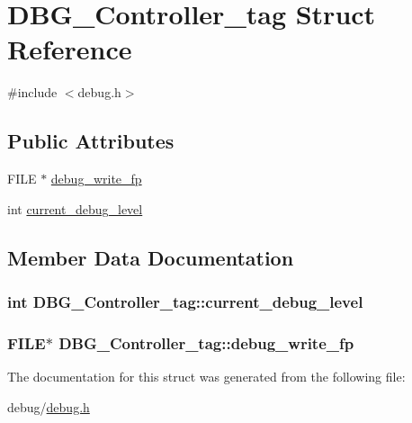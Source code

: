 \hypertarget{struct_d_b_g___controller__tag}{}\section{D\+B\+G\+\_\+\+Controller\+\_\+tag Struct Reference}
\label{struct_d_b_g___controller__tag}


{\ttfamily \#include $<$debug.\+h$>$}

\subsection*{Public Attributes}
\begin{DoxyCompactItemize}
\item 
F\+I\+L\+E $\ast$ \hyperlink{struct_d_b_g___controller__tag_ad3e3029ae7f803b2388ed429b7eaedd8}{debug\+\_\+write\+\_\+fp}
\item 
int \hyperlink{struct_d_b_g___controller__tag_a8ed999c3892963fdb68991a225feb7e7}{current\+\_\+debug\+\_\+level}
\end{DoxyCompactItemize}


\subsection{Member Data Documentation}
\hypertarget{struct_d_b_g___controller__tag_a8ed999c3892963fdb68991a225feb7e7}{}
\subsubsection[{current\+\_\+debug\+\_\+level}]{\setlength{\rightskip}{0pt plus 5cm}int D\+B\+G\+\_\+\+Controller\+\_\+tag\+::current\+\_\+debug\+\_\+level}\label{struct_d_b_g___controller__tag_a8ed999c3892963fdb68991a225feb7e7}
\hypertarget{struct_d_b_g___controller__tag_ad3e3029ae7f803b2388ed429b7eaedd8}{}
\subsubsection[{debug\+\_\+write\+\_\+fp}]{\setlength{\rightskip}{0pt plus 5cm}F\+I\+L\+E$\ast$ D\+B\+G\+\_\+\+Controller\+\_\+tag\+::debug\+\_\+write\+\_\+fp}\label{struct_d_b_g___controller__tag_ad3e3029ae7f803b2388ed429b7eaedd8}


The documentation for this struct was generated from the following file\+:\begin{DoxyCompactItemize}
\item 
debug/\hyperlink{debug_8h}{debug.\+h}\end{DoxyCompactItemize}
